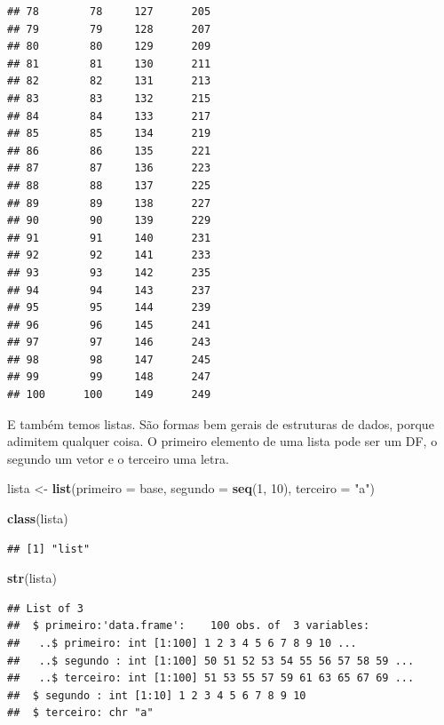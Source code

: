 \documentclass[
]{article}
\newenvironment{Shaded}{\begin{snugshade}}{\end{snugshade}}
\newcommand{\DataTypeTok}[1]{\textcolor[rgb]{0.13,0.29,0.53}{#1}}
\newcommand{\DecValTok}[1]{\textcolor[rgb]{0.00,0.00,0.81}{#1}}
\newcommand{\KeywordTok}[1]{\textcolor[rgb]{0.13,0.29,0.53}{\textbf{#1}}}
\newcommand{\NormalTok}[1]{#1}
\newcommand{\StringTok}[1]{\textcolor[rgb]{0.31,0.60,0.02}{#1}}
\begin{document}
\begin{verbatim}
## 78        78     127      205
## 79        79     128      207
## 80        80     129      209
## 81        81     130      211
## 82        82     131      213
## 83        83     132      215
## 84        84     133      217
## 85        85     134      219
## 86        86     135      221
## 87        87     136      223
## 88        88     137      225
## 89        89     138      227
## 90        90     139      229
## 91        91     140      231
## 92        92     141      233
## 93        93     142      235
## 94        94     143      237
## 95        95     144      239
## 96        96     145      241
## 97        97     146      243
## 98        98     147      245
## 99        99     148      247
## 100      100     149      249
\end{verbatim}

E também temos listas. São formas bem gerais de estruturas de dados,
porque adimitem qualquer coisa. O primeiro elemento de uma lista pode
ser um DF, o segundo um vetor e o terceiro uma letra.

\begin{Shaded}
\begin{Highlighting}[]
\NormalTok{lista <-}\StringTok{ }\KeywordTok{list}\NormalTok{(}\DataTypeTok{primeiro =}\NormalTok{ base,}
             \DataTypeTok{segundo =} \KeywordTok{seq}\NormalTok{(}\DecValTok{1}\NormalTok{, }\DecValTok{10}\NormalTok{),}
             \DataTypeTok{terceiro =} \StringTok{"a"}\NormalTok{)}

\KeywordTok{class}\NormalTok{(lista)}
\end{Highlighting}
\end{Shaded}

\begin{verbatim}
## [1] "list"
\end{verbatim}

\begin{Shaded}
\begin{Highlighting}[]
\KeywordTok{str}\NormalTok{(lista)}
\end{Highlighting}
\end{Shaded}

\begin{verbatim}
## List of 3
##  $ primeiro:'data.frame':    100 obs. of  3 variables:
##   ..$ primeiro: int [1:100] 1 2 3 4 5 6 7 8 9 10 ...
##   ..$ segundo : int [1:100] 50 51 52 53 54 55 56 57 58 59 ...
##   ..$ terceiro: int [1:100] 51 53 55 57 59 61 63 65 67 69 ...
##  $ segundo : int [1:10] 1 2 3 4 5 6 7 8 9 10
##  $ terceiro: chr "a"
\end{verbatim}
\end{document}
